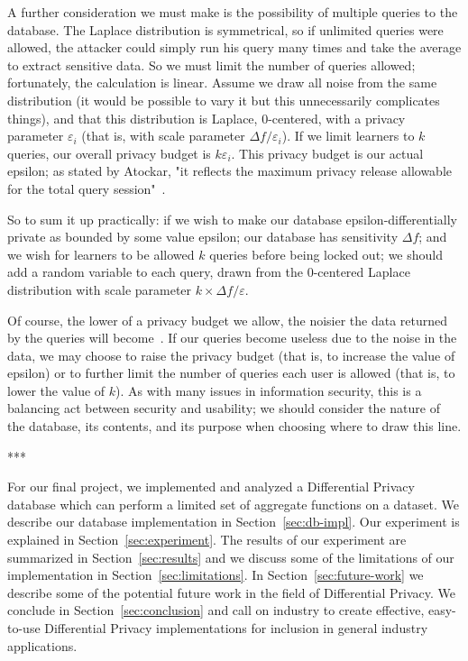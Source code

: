 \documentclass[conference,11pt]{IEEEtran}
\begin{document}
A further consideration we must make is the possibility of multiple queries to
the database. The Laplace distribution is symmetrical, so if unlimited queries
were allowed, the attacker could simply run his query many times and take the
average to extract sensitive data. So we must limit the number of queries
allowed; fortunately, the calculation is linear. Assume we draw all noise from
the same distribution (it would be possible to vary it but this unnecessarily
complicates things), and that this distribution is Laplace, 0-centered, with a
privacy parameter $\varepsilon_i$ (that is, with scale parameter
${\Delta}f/\varepsilon_i$). If we limit learners to $k$ queries, our overall
privacy budget is $k\varepsilon_i$. This privacy budget is our actual epsilon;
as stated by Atockar, "it reflects the maximum privacy release allowable for the
total query session"~\cite{Atockar:2014}.

So to sum it up practically: if we wish to make our database
epsilon-differentially private as bounded by some value epsilon; our database
has sensitivity ${\Delta}f$; and we wish for learners to be allowed $k$ queries
before being locked out; we should add a random variable to each query, drawn
from the 0-centered Laplace distribution with scale parameter $k \times
{\Delta}f/\varepsilon$.

Of course, the lower of a privacy budget we allow, the noisier the data returned
by the queries will become~\cite{Atockar:2014}. If our queries become useless
due to the noise in the data, we may choose to raise the privacy budget (that
is, to increase the value of epsilon) or to further limit the number of queries
each user is allowed (that is, to lower the value of $k$). As with many issues
in information security, this is a balancing act between security and usability;
we should consider the nature of the database, its contents, and its purpose
when choosing where to draw this line.

\begin{center}***\end{center}

For our final project, we implemented and analyzed a Differential Privacy
database which can perform a limited set of aggregate functions on a dataset.
We describe our database implementation in Section~\ref{sec:db-impl}. Our
experiment is explained in Section~\ref{sec:experiment}. The results of our
experiment are summarized in Section~\ref{sec:results} and we discuss some of
the limitations of our implementation in Section~\ref{sec:limitations}. In
Section~\ref{sec:future-work} we describe some of the potential future work in
the field of Differential Privacy. We conclude in Section~\ref{sec:conclusion}
and call on industry to create effective, easy-to-use Differential Privacy
implementations for inclusion in general industry applications.
\end{document}
